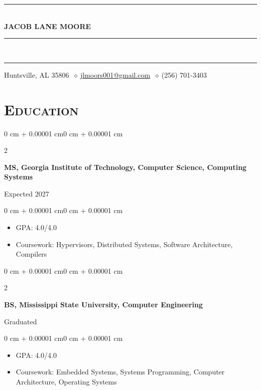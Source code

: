 \documentclass[10pt, letterpaper]{article}
\newenvironment{highlights}{
    \begin{itemize}[
        topsep=0.10 cm,
        parsep=0.10 cm,
        partopsep=0pt,
        itemsep=0pt,
        leftmargin=0.4 cm + 10pt
    ]
}{
    \end{itemize}
}
\newenvironment{onecolentry}{
    \begin{adjustwidth}{0 cm + 0.00001 cm}{0 cm + 0.00001 cm}
}{
    \end{adjustwidth}
}
\newenvironment{twocolentry}[1]{
    \onecolentry
    \def\secondColumn{#1}
    \setcolumnwidth{\fill,4.5cm}
    \begin{paracol}{2}
}{
    \switchcolumn \raggedleft \secondColumn
    \end{paracol}
    \endonecolentry
}
\newcommand{\sep}{\(\ \diamond\ \)}
\begin{document}
\begin{center}

    {\color{primaryColor}\rule{\linewidth}{0.5pt}}\\[0.5em]

    {\fontsize{25pt}{25pt}\selectfont \textbf{\scshape JACOB LANE MOORE}}

    {\color{primaryColor}\rule{\linewidth}{0.5pt}}\\[-0.8em]
    {\color{primaryColor}\rule{\linewidth}{2.5pt}}

    \vspace{0.5em}
    Huntsville, AL 35806 \sep \href{mailto:jlmoors001@gmail.com}{jlmoors001@gmail.com} \sep (256) 701-3403

\end{center}


\section{\scshape Education}

\begin{twocolentry}{Expected 2027}
    \textbf{MS, Georgia Institute of Technology, Computer Science, Computing Systems}
\end{twocolentry}

\vspace{0.10 cm}
\begin{onecolentry}
\begin{highlights}
    \item GPA: 4.0/4.0
    \item Coursework: Hypervisors, Distributed Systems, Software Architecture, Compilers
\end{highlights}
\end{onecolentry}

\vspace{0.3 cm}

\begin{twocolentry}{Graduated}
    \textbf{BS, Mississippi State University, Computer Engineering}
\end{twocolentry}

\vspace{0.10 cm}
\begin{onecolentry}
\begin{highlights}
    \item GPA: 4.0/4.0
    \item Coursework: Embedded Systems, Systems Programming, Computer Architecture, Operating Systems
\end{highlights}
\end{onecolentry}
\end{document}
